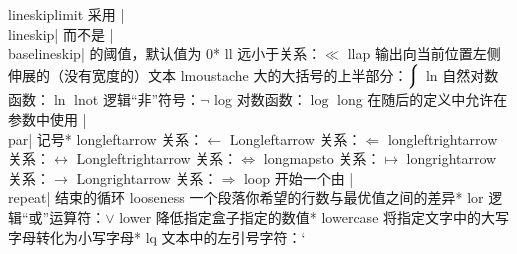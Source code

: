 \capcs lineskiplimit {采用 |\\lineskip| 而不是 |\\base\-line\-skip| 的阈值，默认值为 0\pt}*{}
\capcs ll {远小于关系：$\ll$}{}{}
\capcs llap {输出向当前位置左侧伸展的（没有宽度的）文本}{}{}
\capcs lmoustache {大的大括号的上半部分：$\big\lmoustache$}{}{}
\capcs ln {自然对数函数：$\ln$}{}{}
\capcs lnot {逻辑“非”符号：$\lnot$}{}{}
\capcs log {对数函数：$\log$}{}{}
\capcs long {在随后的定义中允许在参数中使用 |\\par| 记号}*{}
\capcs longleftarrow {关系：$\longleftarrow$}{}{}
\capcs Longleftarrow {关系：$\Longleftarrow$}{}{}
\capcs longleftrightarrow {关系：$\longleftrightarrow$}{}{}
\capcs Longleftrightarrow {关系：$\Longleftrightarrow$}{}{}
\capcs longmapsto {关系：$\longmapsto$}{}{}
\capcs longrightarrow {关系：$\longrightarrow$}{}{}
\capcs Longrightarrow {关系：$\Longrightarrow$}{}{}
\capcs loop {开始一个由 |\\repeat| 结束的循环}{}{}
\capcs looseness {一个段落你希望的行数与最优值之间的差异}*{}
\capcs lor {逻辑“或”运算符：$\lor$}{}{}
\capcs lower {降低指定盒子指定的数值}*{}
\capcs lowercase {将指定文字中的大写字母转化为小写字母}*{}
\capcs lq {文本中的左引号字符：\lq}{}{}
